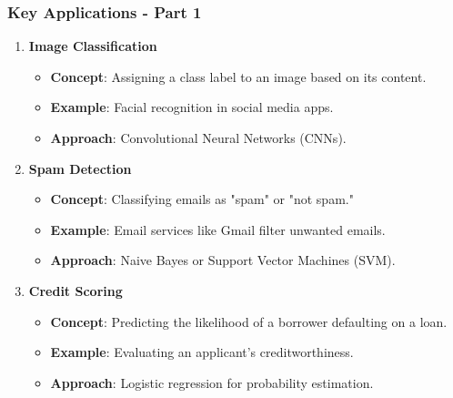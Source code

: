 \documentclass[aspectratio=169]{beamer}
\begin{document}
\begin{frame}
    \frametitle{Key Applications - Part 1}
    \begin{enumerate}
        \item \textbf{Image Classification}
            \begin{itemize}
                \item \textbf{Concept}: Assigning a class label to an image based on its content.
                \item \textbf{Example}: Facial recognition in social media apps.
                \item \textbf{Approach}: Convolutional Neural Networks (CNNs).
            \end{itemize}

        \item \textbf{Spam Detection}
            \begin{itemize}
                \item \textbf{Concept}: Classifying emails as "spam" or "not spam."
                \item \textbf{Example}: Email services like Gmail filter unwanted emails.
                \item \textbf{Approach}: Naive Bayes or Support Vector Machines (SVM).
            \end{itemize}

        \item \textbf{Credit Scoring}
            \begin{itemize}
                \item \textbf{Concept}: Predicting the likelihood of a borrower defaulting on a loan.
                \item \textbf{Example}: Evaluating an applicant’s creditworthiness.
                \item \textbf{Approach}: Logistic regression for probability estimation.
            \end{itemize}
    \end{enumerate}
\end{frame}
\end{document}
